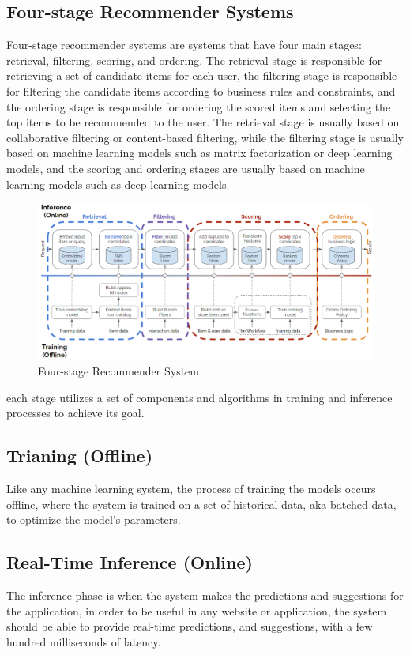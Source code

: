\subsection{Four-stage Recommender Systems}
Four-stage recommender systems are systems that have four main stages: retrieval, filtering, scoring, and ordering. 
The retrieval stage is responsible for retrieving a set of candidate items for each user, 
the filtering stage is responsible for filtering the candidate items according to business rules and constraints,
and the ordering stage is responsible for ordering the scored items and selecting the top items to be recommended to the user. 
The retrieval stage is usually based on collaborative filtering or content-based filtering, while the filtering stage is 
usually based on machine learning models such as matrix factorization or deep learning models, and the scoring and ordering 
stages are usually based on machine learning models such as deep learning models.\cite{NvidiaRecSysBestPractices}
\begin{figure}[H]
    \centering
    \includegraphics[width=1\textwidth]{assets/Four_stage_rec_sys.png}
    \caption{Four-stage Recommender System\cite{NvidiaRecSysBestPractices}}
\end{figure}
each stage utilizes a set of components and algorithms in training and inference processes to achieve its goal.
\subsection{Trianing (Offline)}
Like any machine learning system, the process of training the models occurs offline,
where the system is trained on a set of historical data, aka batched data, to optimize the model's parameters.


\subsection{Real-Time Inference (Online)}
The inference phase is when the system makes the predictions and suggestions for the application, 
in order to be useful in any website or application, 
the system should be able to provide real-time predictions, 
and suggestions, with a few hundred milliseconds of latency.

